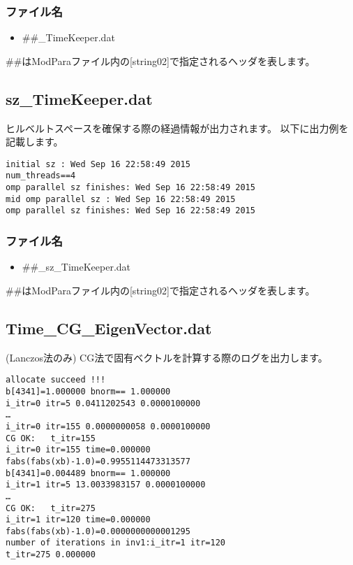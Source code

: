 \subsubsection{ファイル名}
 \begin{itemize}
   \item  \#\#\_TimeKeeper.dat
  \end{itemize}
  \#\#はModParaファイル内の[string02]で指定されるヘッダを表します。


\subsection{sz\_TimeKeeper.dat}
ヒルベルトスペースを確保する際の経過情報が出力されます。
以下に出力例を記載します。

\begin{minipage}{12.5cm}
\begin{screen}
\begin{verbatim}
initial sz : Wed Sep 16 22:58:49 2015
num_threads==4
omp parallel sz finishes: Wed Sep 16 22:58:49 2015
mid omp parallel sz : Wed Sep 16 22:58:49 2015
omp parallel sz finishes: Wed Sep 16 22:58:49 2015
\end{verbatim}
\end{screen}
\end{minipage}
\subsubsection{ファイル名}
 \begin{itemize}
   \item  \#\#\_sz\_TimeKeeper.dat
  \end{itemize}
  \#\#はModParaファイル内の[string02]で指定されるヘッダを表します。

\newpage
\subsection{Time\_CG\_EigenVector.dat}
\label{Subsec:timecgeigenv}
(Lanczos法のみ) CG法で固有ベクトルを計算する際のログを出力します。

\begin{minipage}{12.5cm}
\begin{screen}
\begin{verbatim}
allocate succeed !!! 
b[4341]=1.000000 bnorm== 1.000000 
i_itr=0 itr=5 0.0411202543 0.0000100000 
…
i_itr=0 itr=155 0.0000000058 0.0000100000 
CG OK:   t_itr=155 
i_itr=0 itr=155 time=0.000000  
fabs(fabs(xb)-1.0)=0.9955114473313577
b[4341]=0.004489 bnorm== 1.000000 
i_itr=1 itr=5 13.0033983157 0.0000100000 
…
CG OK:   t_itr=275 
i_itr=1 itr=120 time=0.000000  
fabs(fabs(xb)-1.0)=0.0000000000001295
number of iterations in inv1:i_itr=1 itr=120 
t_itr=275 0.000000
\end{verbatim}
\end{screen}
\end{minipage}
